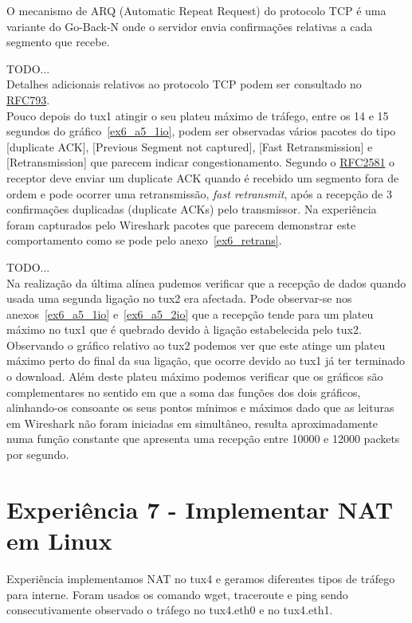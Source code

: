 \documentclass[11pt,a4paper,reqno]{report}
\numberwithin{equation}{section}
\begin{document}
O mecanismo de ARQ (Automatic Repeat Request) do protocolo TCP é uma variante do Go-Back-N onde o servidor envia confirmações relativas a cada segmento que recebe.

TODO...\\

Detalhes adicionais relativos ao protocolo TCP podem ser consultado no \href{https://www.ietf.org/rfc/rfc793.txt}{RFC793}.\\

Pouco depois do tux1 atingir o seu plateu máximo de tráfego, entre os 14 e 15 segundos do gráfico~\ref{ex6_a5_1io}, podem ser observadas vários pacotes do tipo [duplicate ACK], [Previous Segment not captured], [Fast Retransmission] e [Retransmission] que parecem indicar congestionamento.
Segundo o \href{http://www.ietf.org/rfc/rfc2581.txt}{RFC2581} o receptor deve enviar um duplicate ACK quando é recebido um segmento fora de ordem e pode ocorrer uma retransmissão, \emph{fast retransmit}, após a recepção de 3 confirmações duplicadas (duplicate ACKs) pelo transmissor. Na experiência foram capturados pelo Wireshark pacotes que parecem demonstrar este comportamento como se pode pelo anexo~\ref{ex6_retrans}.

TODO...\\

Na realização da última alínea pudemos verificar que a recepção de dados quando usada uma segunda ligação no tux2 era afectada. Pode observar-se nos anexos~\ref{ex6_a5_1io} e~\ref{ex6_a5_2io} que a recepção  tende para um plateu máximo no tux1 que é quebrado devido à ligação estabelecida pelo tux2. Observando o gráfico relativo ao tux2 podemos ver que este atinge um plateu máximo perto do final da sua ligação, que ocorre devido ao tux1 já ter terminado o download. Além deste plateu máximo podemos verificar que os gráficos são complementares no sentido em que a soma das funções dos dois gráficos, alinhando-os consoante os seus pontos mínimos e máximos dado que as leituras em Wireshark não foram iniciadas em simultâneo, resulta aproximadamente numa função constante que apresenta uma recepção entre 10000 e 12000 packets por segundo.

\section{Experiência 7 - Implementar NAT em Linux}

Experiência implementamos NAT no tux4 e geramos diferentes tipos de tráfego para interne. Foram usados os comando wget, traceroute e ping sendo consecutivamente observado o tráfego no tux4.eth0 e no tux4.eth1.\\
\end{document}
